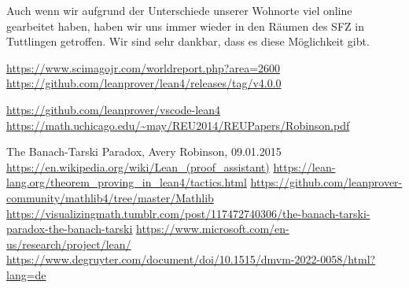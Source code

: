\documentclass[10pt]{article}
\begin{document}
\noindent Auch wenn wir aufgrund der Unterschiede unserer Wohnorte viel online gearbeitet haben, haben wir uns immer wieder in den Räumen des SFZ in Tuttlingen getroffen. Wir sind sehr dankbar, dass es diese Möglichkeit gibt. 


\renewcommand\refname{Quellenverzeichnis}
\begin{thebibliography}{99}
\url{https://www.scimagojr.com/worldreport.php?area=2600}
\url{https://github.com/leanprover/lean4/releases/tag/v4.0.0}\par
{}
\url{https://github.com/leanprover/vscode-lean4}
\url{https://math.uchicago.edu/~may/REU2014/REUPapers/Robinson.pdf} \par
The Banach-Tarski Paradox, Avery Robinson, 09.01.2015
\url{https://en.wikipedia.org/wiki/Lean_(proof_assistant)}
 \url{https://lean-lang.org/theorem_proving_in_lean4/tactics.html}
 \url{https://github.com/leanprover-community/mathlib4/tree/master/Mathlib}
\url{https://visualizingmath.tumblr.com/post/117472740306/the-banach-tarski-paradox-the-banach-tarski}
\url{https://www.microsoft.com/en-us/research/project/lean/}
\url{https://www.degruyter.com/document/doi/10.1515/dmvm-2022-0058/html?lang=de}
\end{thebibliography}

\end{document}
